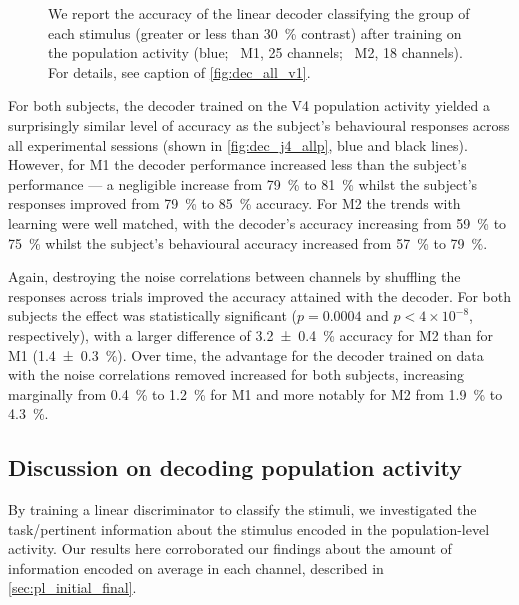 \begin{figure}[htbp]
{    }
    \hspace*{\fill}
    \caption{%
    We report the accuracy of the linear decoder classifying the group of each stimulus (greater or less than \SI{30}{\percent} contrast) after training on the population activity (blue; \protect{}~\ac{M1}, \num{25} channels; \protect{}~\ac{M2}, \num{18} channels).
    For details, see caption of \autoref{fig:dec_all_v1}.
}
    \label{fig:dec_all_v4}
\end{figure}

For both subjects, the decoder trained on the \ac{V4} population activity yielded a surprisingly similar level of accuracy as the subject's behavioural responses across all experimental sessions (shown in \autoref{fig:dec_j4_allp}, blue and black lines).
However, for \ac{M1} the decoder performance increased less than the subject's performance --- a negligible increase from \SI{79}{\percent} to \SI{81}{\percent} whilst the subject's responses improved from \SI{79}{\percent} to \SI{85}{\percent} accuracy.
For \ac{M2} the trends with learning were well matched, with the decoder's accuracy increasing from \SI{59}{\percent} to \SI{75}{\percent} whilst the subject's behavioural accuracy increased from \SI{57}{\percent} to \SI{79}{\percent}.

Again, destroying the noise correlations between channels by shuffling the responses across trials improved the accuracy attained with the decoder.
For both subjects the effect was statistically significant ($p=0.0004$ and $p < 4 \times 10^{-8}$, respectively), with a larger difference of \SI{+3.2\pm0.4}{\percent} accuracy for \ac{M2} than for \ac{M1} (\SI{+1.4\pm0.3}{\percent}).
Over time, the advantage for the decoder trained on data with the noise correlations removed increased for both subjects, increasing marginally from \SI{0.4}{\percent} to \SI{1.2}{\percent} for \ac{M1} and more notably for \ac{M2} from \SI{1.9}{\percent} to \SI{4.3}{\percent}.


\subsection{Discussion on decoding population activity}

By training a linear discriminator to classify the stimuli, we investigated the task\-/pertinent information about the stimulus encoded in the population-level activity.
Our results here corroborated our findings about the amount of information encoded on average in each channel, described in \autoref{sec:pl_initial_final}.

